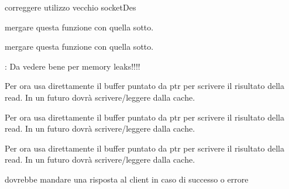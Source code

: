 
\begin{DoxyRefList}
\item[\label{todo__todo000006}%
\hypertarget{todo__todo000006}{}%
global\+Scope$>$ Globale \hyperlink{OPE_8c_ad902fd8b94b926056967098b6faeb111}{create\+Data\+Sock} (int port\+No, int socket\+Id)]correggere utilizzo vecchio socket\+Des  
\item[\label{todo__todo000002}%
\hypertarget{todo__todo000002}{}%
global\+Scope$>$ Globale \hyperlink{CommandsHandler_8h_a919c7f4b4bcb820f1d6566238178390e}{get\+Command\+I\+D} (char $\ast$)]mergare questa funzione con quella sotto.  
\item[\label{todo__todo000002}%
\hypertarget{todo__todo000002}{}%
global\+Scope$>$ Globale \hyperlink{CommandsHandler_8h_a919c7f4b4bcb820f1d6566238178390e}{get\+Command\+I\+D} (char $\ast$)]mergare questa funzione con quella sotto.  
\item[\label{todo__todo000005}%
\hypertarget{todo__todo000005}{}%
global\+Scope$>$ Globale \hyperlink{OPE_8c_a6eccb6ec6ec9c8375e70ab4088b511a5}{handle\+Open\+Command} (char $\ast$command, int socket)]\+: Da vedere bene per memory leaks!!!!  
\item[\label{todo__todo000001}%
\hypertarget{todo__todo000001}{}%
global\+Scope$>$ Globale \hyperlink{Client_2READ_8c_aa4b63039ca9686f5666ce6bbb33317d7}{mydfs\+\_\+read} (\hyperlink{structMyDFSId}{My\+D\+F\+S\+Id} $\ast$id, int pos, void $\ast$ptr, unsigned int size)]Per ora usa direttamente il buffer puntato da ptr per scrivere il risultato della read. In un futuro dovrà scrivere/leggere dalla cache. 
\item[\label{todo__todo000001}%
\hypertarget{todo__todo000001}{}%
global\+Scope$>$ Globale \hyperlink{Client_2READ_8c_aa4b63039ca9686f5666ce6bbb33317d7}{mydfs\+\_\+read} (\hyperlink{structMyDFSId}{My\+D\+F\+S\+Id} $\ast$id, int pos, void $\ast$ptr, unsigned int size)]Per ora usa direttamente il buffer puntato da ptr per scrivere il risultato della read. In un futuro dovrà scrivere/leggere dalla cache. 
\item[\label{todo__todo000001}%
\hypertarget{todo__todo000001}{}%
global\+Scope$>$ Globale \hyperlink{Client_2READ_8c_aa4b63039ca9686f5666ce6bbb33317d7}{mydfs\+\_\+read} (\hyperlink{structMyDFSId}{My\+D\+F\+S\+Id} $\ast$id, int pos, void $\ast$ptr, unsigned int size)]Per ora usa direttamente il buffer puntato da ptr per scrivere il risultato della read. In un futuro dovrà scrivere/leggere dalla cache. 
\item[\label{todo__todo000004}%
\hypertarget{todo__todo000004}{}%
File \hyperlink{OPE_8c}{O\+P\+E.c} ]dovrebbe mandare una risposta al client in caso di successo o errore 


\end{DoxyRefList}
